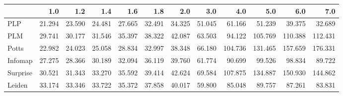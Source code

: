 \begin{tabular}{lrrrrrrrrrrr}
\toprule
{} &    1.0 &    1.2 &    1.4 &    1.6 &    1.8 &    2.0 &    3.0 &     4.0 &     5.0 &     6.0 &     7.0 \\
\midrule
PLP      & 21.294 & 23.590 & 24.481 & 27.665 & 32.491 & 34.325 & 51.045 &  61.166 &  51.239 &  39.375 &  32.689 \\
PLM      & 29.741 & 30.177 & 31.546 & 35.397 & 38.322 & 42.087 & 63.503 &  94.122 & 105.769 & 110.388 & 112.431 \\
Potts    & 22.982 & 24.023 & 25.058 & 28.834 & 32.997 & 38.348 & 66.180 & 104.736 & 131.465 & 157.659 & 176.331 \\
Infomap  & 27.275 & 28.366 & 30.189 & 32.094 & 36.119 & 39.760 & 61.774 &  90.699 &  99.526 &  98.834 &  89.722 \\
Surprise & 30.521 & 31.343 & 33.270 & 35.592 & 39.414 & 42.624 & 69.584 & 107.875 & 134.887 & 150.930 & 144.862 \\
Leiden   & 33.174 & 33.346 & 33.722 & 35.372 & 37.858 & 40.017 & 59.800 &  85.048 &  89.757 &  87.261 &  83.831 \\
\bottomrule
\end{tabular}
